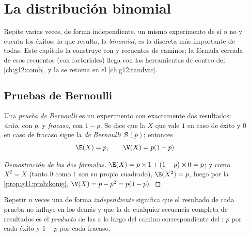 \chapter{La distribución binomial}\label{ch:g11:binom}

Repite varias veces, de forma independiente, un mismo experimento de sí o
no y cuenta los éxitos: la  que resulta, la \emph{binomial}, es
la  discreta más importante de todas. Este capítulo la
construye con  y recuentos de caminos; la fórmula cerrada de esos
recuentos (con factoriales) llega con las herramientas de conteo del
\cref{ch:g12:comb}, y la  se retoma en el
\cref{ch:g12:randvar}.

\section{Pruebas de Bernoulli}

\begin{definition}\label{def:g11:binom:bernoulli}
Una \emph{prueba de Bernoulli} es un
experimento con exactamente dos resultados: \emph{éxito}, con 
$p$, y \emph{fracaso}, con  $1 - p$. Se dice que la  $X$ que vale $1$ en caso de éxito y $0$ en caso de fracaso sigue
la \emph{ de Bernoulli} $\mathcal B(p)$; entonces
\[
\E(X) = p,
\qquad
\V(X) = p(1 - p).
\]
\end{definition}

\begin{proof}[Demostración de las dos fórmulas]
$\E(X) = p \times 1 + (1-p) \times 0 = p$; y como $X^2 = X$ (tanto $0$
como $1$ son su propio cuadrado), $\E(X^2) = p$, luego por la
\cref{prop:g11:prob:konig}, $\V(X) = p - p^2 = p(1-p)$.
\end{proof}

\begin{definition}\label{def:g11:binom:repeated}
Repetir $n$ veces una  de forma
\emph{independiente} significa que el resultado de cada prueba no influye
en los demás y que la  de cualquier secuencia completa de
resultados es el \emph{producto} de las  a lo largo del
camino correspondiente del : $p$ por cada éxito y $1 - p$ por cada
fracaso.
\end{definition}

